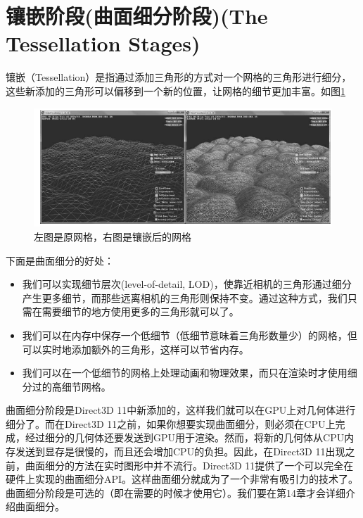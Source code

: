 \documentclass[11pt,a4paper,oldfontcommands]{memoir}
\begin{document}
{\section{镶嵌阶段(曲面细分阶段)(The Tessellation Stages)}
\begin{flushleft}
镶嵌（Tessellation）是指通过添加三角形的方式对一个网格的三角形进行细分，这些新添加的三角形可以偏移到一个新的位置，让网格的细节更加丰富。如图\ref{fig:5-26}
\end{flushleft}
\begin{figure}[h]
	\includegraphics[width=\textwidth]{5-26}
	\centering
	\caption{左图是原网格，右图是镶嵌后的网格}
	\label{fig:5-26}
\end{figure}

\begin{flushleft}
下面是曲面细分的好处：
\begin{itemize}
    \item 我们可以实现细节层次(level-of-detail, LOD)，使靠近相机的三角形通过细分产生更多细节，而那些远离相机的三角形则保持不变。通过这种方式，我们只需在需要细节的地方使用更多的三角形就可以了。
    \item 我们可以在内存中保存一个低细节（低细节意味着三角形数量少）的网格，但可以实时地添加额外的三角形，这样可以节省内存。
    \item 我们可以在一个低细节的网格上处理动画和物理效果，而只在渲染时才使用细分过的高细节网格。
\end{itemize}
曲面细分阶段是Direct3D 11中新添加的，这样我们就可以在GPU上对几何体进行细分了。而在Direct3D 11之前，如果你想要实现曲面细分，则必须在CPU上完成，经过细分的几何体还要发送到GPU用于渲染。然而，将新的几何体从CPU内存发送到显存是很慢的，而且还会增加CPU的负担。因此，在Direct3D 11出现之前，曲面细分的方法在实时图形中并不流行。Direct3D 11提供了一个可以完全在硬件上实现的曲面细分API。这样曲面细分就成为了一个非常有吸引力的技术了。曲面细分阶段是可选的（即在需要的时候才使用它）。我们要在第14章才会详细介绍曲面细分。
\end{flushleft}

}
\end{document}
